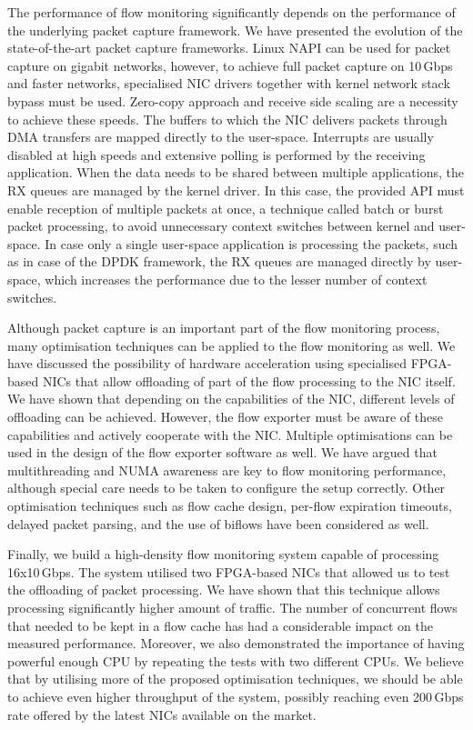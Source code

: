 The performance of flow monitoring significantly depends on the performance of the underlying packet capture framework. We have presented the evolution of the state-of-the-art packet capture frameworks. Linux NAPI can be used for packet capture on gigabit networks, however, to achieve full packet capture on 10\,Gbps and faster networks, specialised NIC drivers together with kernel network stack bypass must be used. Zero-copy approach and receive side scaling are a necessity to achieve these speeds. The buffers to which the NIC delivers packets through DMA transfers are mapped directly to the user-space. Interrupts are usually disabled at high speeds and extensive polling is performed by the receiving application. When the data needs to be shared between multiple applications, the RX queues are managed by the kernel driver. In this case, the provided API must enable reception of multiple packets at once, a technique called batch or burst packet processing, to avoid unnecessary context switches between kernel and user-space. In case only a single user-space application is processing the packets, such as in case of the DPDK framework, the RX queues are managed directly by user-space, which increases the performance due to the lesser number of context switches.

Although packet capture is an important part of the flow monitoring process, many optimisation techniques can be applied to the flow monitoring as well. We have discussed the possibility of hardware acceleration using specialised FPGA-based NICs that allow offloading of part of the flow processing to the NIC itself. We have shown that depending on the capabilities of the NIC, different levels of offloading can be achieved. However, the flow exporter must be aware of these capabilities and actively cooperate with the NIC. Multiple optimisations can be used in the design of the flow exporter software as well. We have argued that multithreading and NUMA awareness are key to flow monitoring performance, although special care needs to be taken to configure the setup correctly. Other optimisation techniques such as flow cache design, per-flow expiration timeouts, delayed packet parsing, and the use of biflows have been considered as well.

Finally, we build a high-density flow monitoring system capable of processing 16x10\,Gbps. The system utilised two FPGA-based NICs that allowed us to test the offloading of packet processing. We have shown that this technique allows processing significantly higher amount of traffic. The number of concurrent flows that needed to be kept in a flow cache has had a considerable impact on the measured performance. Moreover, we also demonstrated the importance of having powerful enough CPU by repeating the tests with two different CPUs. We believe that by utilising more of the proposed optimisation techniques, we should be able to achieve even higher throughput of the system, possibly reaching even 200\,Gbps rate offered by the latest NICs available on the market.